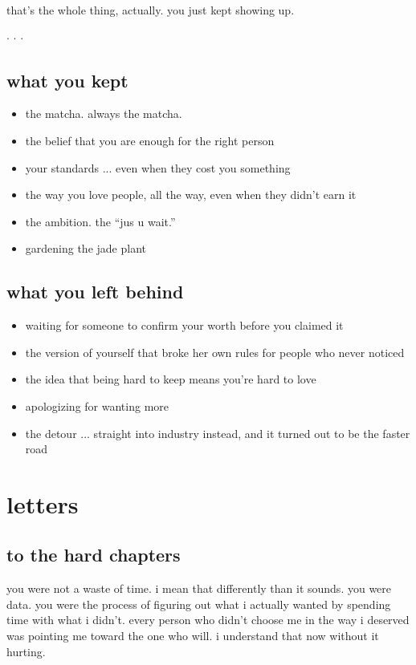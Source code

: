\documentclass[12pt, letterpaper]{article}
\newcommand{\softbreak}{%
  \begin{center}
    \textcolor{moxie}{\small $\cdot$ \quad $\cdot$ \quad $\cdot$}
  \end{center}
}
\begin{document}
that's the whole thing, actually. you just kept showing up.

\softbreak

\subsection{what you kept}
\begin{itemize}
  \item the matcha. always the matcha.
  \item the belief that you are enough for the right person
  \item your standards ... even when they cost you something
  \item the way you love people, all the way, even when they didn't earn it
  \item the ambition. the ``jus u wait.''
  \item gardening the jade plant
\end{itemize}

\subsection{what you left behind}
\begin{itemize}
  \item waiting for someone to confirm your worth before you claimed it
  \item the version of yourself that broke her own rules for people who never noticed
  \item the idea that being hard to keep means you're hard to love
  \item apologizing for wanting more
  \item the detour ... straight into industry instead, and it turned out to be the faster road
\end{itemize}

\section{letters}

\subsection{to the hard chapters}

you were not a waste of time. i mean that differently than it sounds. you were data. you were the process of figuring out what i actually wanted by spending time with what i didn't. every person who didn't choose me in the way i deserved was pointing me toward the one who will. i understand that now without it hurting.
\end{document}
